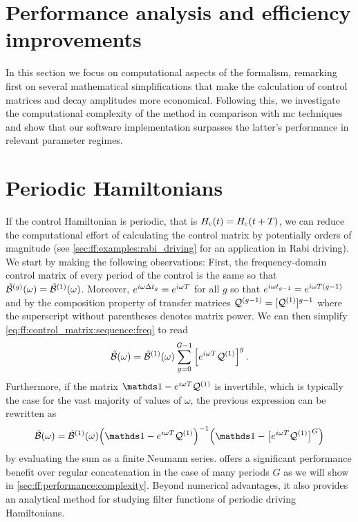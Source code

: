 \section{Performance analysis and efficiency improvements}\label{sec:ff:performance}
In this section we focus on computational aspects of the formalism, remarking first on several mathematical simplifications that make the calculation of control matrices and decay amplitudes more economical.
Following this, we investigate the computational complexity of the method in comparison with \gls{mc} techniques and show that our software implementation surpasses the latter's performance in relevant parameter regimes.

\section{Periodic Hamiltonians}\label{sec:ff:performance:periodic_hamiltonians}
If the control Hamiltonian is periodic, that is $H_{\mathrm{c}}(t) = H_{\mathrm{c}}(t + T)$, we can reduce the computational effort of calculating the control matrix by potentially orders of magnitude (see \cref{sec:ff:examples:rabi_driving} for an application in Rabi driving).
We start by making the following observations: First, the frequency-domain control matrix of every period of the control is the same so that $\tilde{\mathcal{B}}^{(g)}(\omega) = \tilde{\mathcal{B}}^{(1)}(\omega)$.
Moreover, $e^{i\omega\Delta t_g} = e^{i\omega T}$ for all $g$ so that $e^{i\omega t_{g-1}} = e^{i\omega T(g - 1)}$ and by the composition property of transfer matrices $\mathcal{Q}^{(g-1)} = [\mathcal{Q}^{(1)}]^{g-1}$ where the superscript without parentheses denotes matrix power.
We can then simplify \cref{eq:ff:control_matrix:sequence:freq} to read
\begin{equation}\label{eq:ff:control_matrix:sequence:periodic:explicit}
    \tilde{\mathcal{B}}(\omega) = \tilde{\mathcal{B}}^{(1)}(\omega)\sum_{g=0}^{G-1}\left[e^{i\omega T}\mathcal{Q}^{(1)}\right]^g.
\end{equation}
Furthermore, if the matrix $\eye - \e^{\i\omega T}\liouvQ\gth{1}$ is invertible, which is typically the case for the vast majority of values of $\omega$, the previous expression can be rewritten as
\begin{equation}\label{eq:ff:control_matrix:sequence:periodic:simplified}
    \ctrlmat(\omega) = \ctrlmat\gth{1}(\omega)\Bigl(\eye - \e^{\i\omega T}\liouvQ\gth{1}\Bigr)^{-1}
        \Bigl(\eye - \bigl[\e^{\i\omega T}\liouvQ\gth{1}\bigr]^G\Bigr)
\end{equation}
by evaluating the sum as a finite Neumann series.
 offers a significant performance benefit over regular concatenation in the case of many periods $G$ as we will show in \cref{sec:ff:performance:complexity}.
Beyond numerical advantages, it also provides an analytical method for studying filter functions of periodic driving Hamiltonians.

